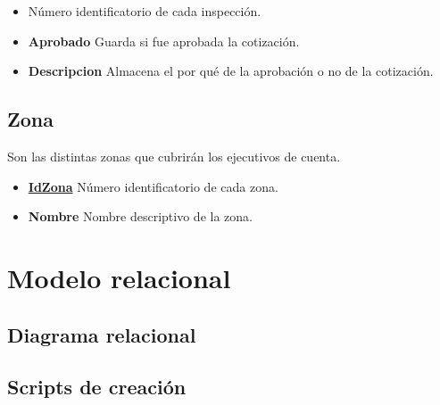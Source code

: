 \documentclass[a4paper,11pt]{article}
\begin{document}
\begin{itemize}
   
  \item \textbf{} Número identificatorio de cada inspección.
  
  \item \textbf{Aprobado} Guarda si fue aprobada la cotización.
  
  \item \textbf{Descripcion} Almacena el por qué de la aprobación o no de la cotización.
  
\end{itemize}

\subsection{Zona}

Son las distintas zonas que cubrirán los ejecutivos de cuenta.

\begin{itemize}
   
  \item \textbf{\uline{IdZona}} Número identificatorio de cada zona.
  
  \item \textbf{Nombre} Nombre descriptivo de la zona.
  
\end{itemize}

\section{Modelo relacional}

\subsection{Diagrama relacional}


\begin{figure}[h!t]
\end{figure}

\FloatBarrier

\subsection{Scripts de creación}
\end{document}
